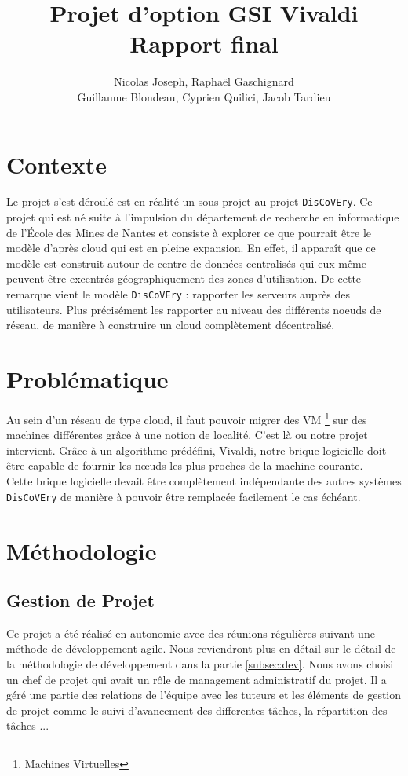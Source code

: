 \documentclass[11pt,a4paper]{article}
\title{Projet d'option GSI Vivaldi \\ Rapport final}
\author{Nicolas Joseph, Raphaël Gaschignard\\ Guillaume Blondeau, Cyprien Quilici, Jacob Tardieu}
\begin{document}
\maketitle
\section{Contexte}

Le projet s'est déroulé est en réalité un sous-projet au projet \texttt{DisCoVEry}. Ce projet qui est né suite à l’impulsion du département de recherche en informatique de l'École des Mines de Nantes et consiste à explorer ce que pourrait être le modèle d’après cloud qui est en pleine expansion. En effet, il apparaît que ce modèle est construit autour de centre de données centralisés qui eux même peuvent être excentrés géographiquement des zones d’utilisation. De cette remarque vient  le modèle \texttt{DisCoVEry} : rapporter les serveurs auprès des utilisateurs. Plus précisément les rapporter au niveau des différents noeuds de réseau, de manière à construire un cloud complètement décentralisé.

\section{Problématique}
Au sein d'un réseau de type cloud, il faut pouvoir migrer des VM \footnote{Machines Virtuelles} sur des machines différentes grâce à une notion de localité. C'est là ou notre projet intervient. Grâce à un algorithme prédéfini, Vivaldi, notre brique logicielle doit être capable de fournir les n\oe uds les plus proches de la machine courante.\\

Cette brique logicielle devait être complètement indépendante des autres systèmes \texttt{DisCoVEry} de manière à pouvoir être remplacée facilement le cas échéant.

\section{Méthodologie}
\subsection{Gestion de Projet}
Ce projet a été réalisé en autonomie avec des réunions régulières suivant une méthode de développement agile. Nous reviendront plus en détail sur le détail de la méthodologie de développement dans la partie \ref{subsec:dev}. Nous avons choisi un chef de projet qui avait un rôle de management administratif du projet. Il a géré une partie des relations de l'équipe avec les tuteurs et les éléments de gestion de projet comme le suivi d'avancement des differentes tâches, la répartition des tâches ...\\
\end{document}
